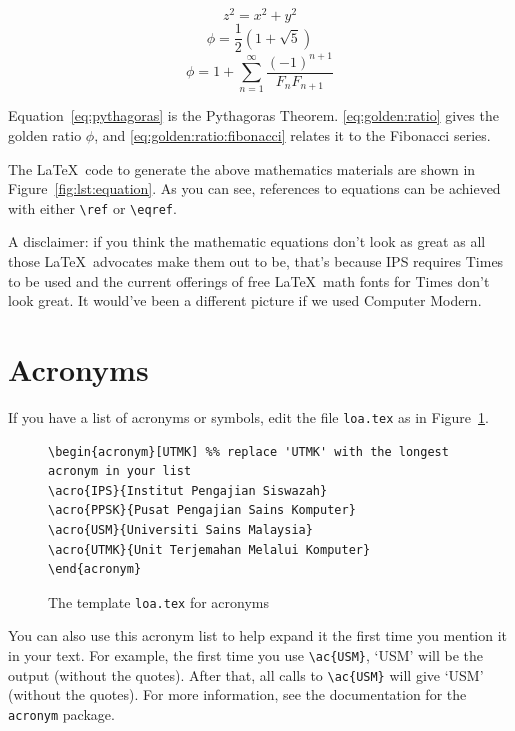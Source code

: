 \begin{equation}\label{eq:pythagoras}
  z^2 = x^2 + y^2
\end{equation}
\begin{equation}\label{eq:golden:ratio}
  \phi = \frac{1}{2} (1 + \sqrt{5})
\end{equation}
\begin{equation}\label{eq:golden:ratio:fibonacci}
  \phi = 1 + \sum ^ {\infty} _ {n=1}
  \frac{ (-1) ^ {n+1} }{ F_n F_{n+1} }
\end{equation}

Equation~\ref{eq:pythagoras} is the Pythagoras Theorem. \eqref{eq:golden:ratio} gives the golden ratio $\phi$, and \eqref{eq:golden:ratio:fibonacci} relates it to the Fibonacci series.

The \LaTeX\ code to generate the above mathematics materials are shown in Figure~\ref{fig:lst:equation}.  As you can see, references to equations can be achieved with either \verb|\ref| or \verb|\eqref|.

A disclaimer: if you think the mathematic equations don't look as great as all those \LaTeX\ advocates make them out to be, that's because IPS requires Times to be used and the current offerings of free \LaTeX\ math fonts for Times don't look great. It would've been a different picture if we used Computer Modern.

\section{Acronyms}
\acresetall
If you have a list of acronyms or symbols, edit the file \verb|loa.tex| as in Figure~\ref{fig:acronym}.

\begin{figure}[hbt!]
  \begin{lstlisting}
\begin{acronym}[UTMK] %% replace 'UTMK' with the longest acronym in your list
\acro{IPS}{Institut Pengajian Siswazah}
\acro{PPSK}{Pusat Pengajian Sains Komputer}
\acro{USM}{Universiti Sains Malaysia}
\acro{UTMK}{Unit Terjemahan Melalui Komputer}
\end{acronym}
\end{lstlisting}
  \caption{The template \texttt{loa.tex} for acronyms}\label{fig:acronym}
\end{figure}

You can also use this acronym list to help expand it the first time you mention it in your text.  For example, the first time you use \verb|\ac{USM}|, `\ac{USM}' will be the output (without the quotes).  After that, all calls to \verb|\ac{USM}| will give `\ac{USM}' (without the quotes).  For more information, see the documentation for the \texttt{acronym} package.


